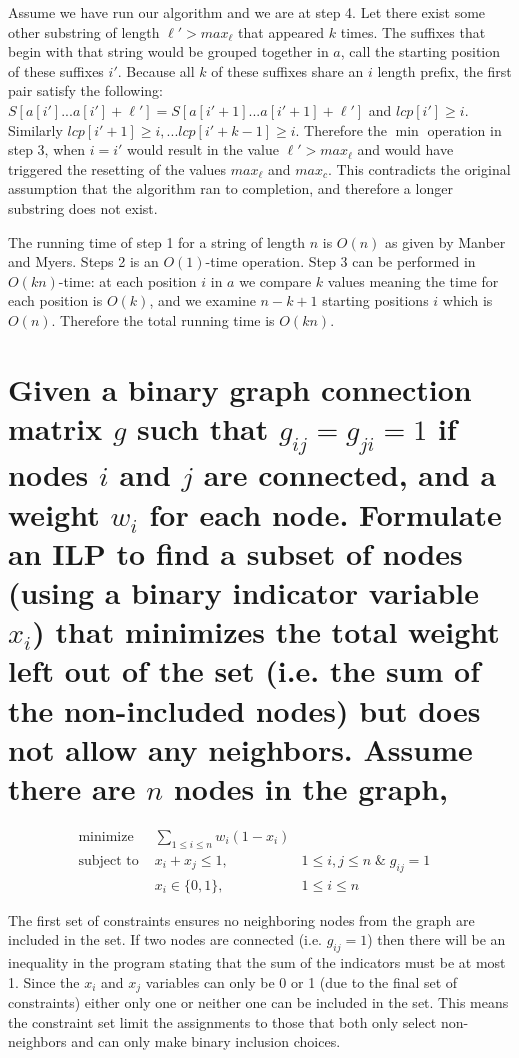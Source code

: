 \documentclass[11pt, oneside]{article}   	%
\begin{document}
Assume we have run our algorithm and we are at step 4. 
Let there exist some other substring of length $\ell'>max_\ell$ that appeared $k$ times.
The suffixes that begin with that string would be grouped together in $a$, call the starting position of these suffixes $i'$. 
Because all $k$ of these suffixes share an $i$ length prefix, the first pair satisfy the following: $S[a[i']...a[i']+\ell'] = S[a[i'+1]...a[i'+1]+\ell']$ and $lcp[i']\ge i$. 
Similarly $lcp[i'+1]\ge i, ... lcp[i'+k-1]\ge i$. 
Therefore the $\min$ operation in step 3, when $i=i'$ would result in the value $\ell' > max_\ell$ and would have triggered the resetting of the values $max_\ell$ and $max_c$. 
This contradicts the original assumption that the algorithm ran to completion, and therefore a longer substring does not exist. 

The running time of step 1 for a string of length $n$ is $O(n)$ as given by Manber and Myers. 
Steps 2 is an $O(1)$-time operation. 
Step 3 can be performed in $O(kn)$-time: at each position $i$ in $a$ we compare $k$ values meaning the time for each position is $O(k)$, and we examine $n-k+1$ starting positions $i$ which is $O(n)$.
Therefore the total running time is $O(kn)$.


\section{Given a binary graph connection matrix $g$ such that $g_{ij} = g_{ji} = 1$ if nodes $i$ and $j$ are connected, and a weight $w_{i}$ for each node. 
Formulate an ILP to find a subset of nodes (using a binary indicator variable $x_i$) that minimizes the total weight left out of the set (i.e. the sum of the non-included nodes) but does not allow any neighbors. 
Assume there are $n$ nodes in the graph,}

\begin{equation}
\begin{array}{rlclcl}
\text{minimize}  & \displaystyle \sum_{1\leq i \leq n} w_i (1 - x_i)  &&\\
\text{subject to }& x_i + x_j \le 1,  & 1 \le i,j \le n \;\&\; g_{ij} = 1\\
			& x_{i} \in \{0,1\},&1 \le i \le n
\end{array}
\end{equation}

The first set of constraints ensures no neighboring nodes from the graph are included in the set. 
If two nodes are connected (i.e. $g_{ij} = 1$) then there will be an inequality in the program stating that the sum of the indicators must be at most 1. 
Since the $x_i$ and $x_j$ variables can only be 0 or 1 (due to the final set of constraints) either only one or neither one can be included in the set. 
This means the constraint set limit the assignments to those that both only select non-neighbors and can only make binary inclusion choices. 
\end{document}
